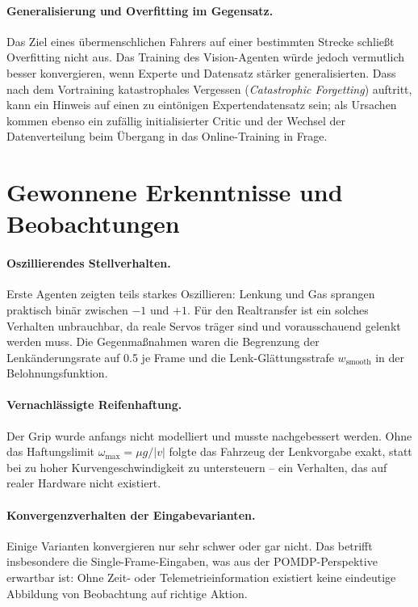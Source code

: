 \paragraph{Generalisierung und Overfitting im Gegensatz.}
Das Ziel eines übermenschlichen Fahrers auf einer bestimmten Strecke schließt Overfitting nicht aus. Das Training des Vision-Agenten würde jedoch vermutlich besser konvergieren, wenn Experte und Datensatz stärker generalisierten. Dass nach dem Vortraining katastrophales Vergessen (\emph{Catastrophic Forgetting}) auftritt, kann ein Hinweis auf einen zu eintönigen Expertendatensatz sein; als Ursachen kommen ebenso ein zufällig initialisierter Critic und der Wechsel der Datenverteilung beim Übergang in das Online-Training in Frage.

\section{Gewonnene Erkenntnisse und Beobachtungen}
\label{subsec:erkenntnisse_phase1}

\paragraph{Oszillierendes Stellverhalten.}
Erste Agenten zeigten teils starkes Oszillieren: Lenkung und Gas sprangen praktisch binär zwischen $-1$ und $+1$. Für den Realtransfer ist ein solches Verhalten unbrauchbar, da reale Servos träger sind und vorausschauend gelenkt werden muss. Die Gegenmaßnahmen waren die Begrenzung der Lenkänderungsrate auf \num{0.5} je Frame und die Lenk-Glättungsstrafe $w_{\text{smooth}}$ in der Belohnungsfunktion.

\paragraph{Vernachlässigte Reifenhaftung.}
Der Grip wurde anfangs nicht modelliert und musste nachgebessert werden. Ohne das Haftungslimit $\omega_{\max} = \mu g / |v|$ folgte das Fahrzeug der Lenkvorgabe exakt, statt bei zu hoher Kurvengeschwindigkeit zu untersteuern -- ein Verhalten, das auf realer Hardware nicht existiert.

\paragraph{Konvergenzverhalten der Eingabevarianten.}
Einige Varianten konvergieren nur sehr schwer oder gar nicht. Das betrifft insbesondere die Single-Frame-Eingaben, was aus der \ac{POMDP}-Perspektive erwartbar ist: Ohne Zeit- oder Telemetrieinformation existiert keine eindeutige Abbildung von Beobachtung auf richtige Aktion.

